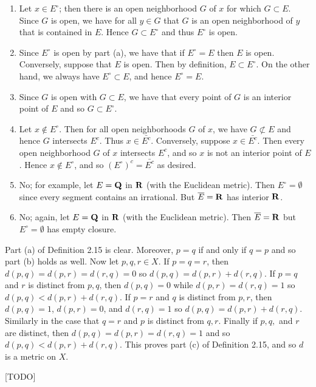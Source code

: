 \begin{ex}
\begin{enumerate}
\item Let $x \in E^{\circ}$; then there is an open neighborhood $G$ of $x$ for which $G \subset E$. Since $G$ is open, we have for all $y \in G$ that $G$ is an open neighborhood of $y$ that is contained in $E$. Hence $G \subset E^{\circ}$ and thus $E^{\circ}$ is open.

\item Since $E^{\circ}$ is open by part (a), we have that if $E^{\circ} = E$ then $E$ is open. Conversely, suppose that $E$ is open. Then by definition, $E \subset E^{\circ}$. On the other hand, we always have $E^{\circ} \subset E$, and hence $E^{\circ} = E$.

\item Since $G$ is open with $G \subset E$, we have that every point of $G$ is an interior point of $E$ and so $G \subset E^{\circ}$.

\item Let $x \not \in E^{\circ}$. Then for all open neighborhoods $G$ of $x$, we have $G \not \subset E$ and hence $G$ intersects $E^c$. Thus $x \in \bar{E^c}$. Conversely, suppose $x \in \bar{E^c}$. Then every open neighborhood $G$ of $x$ intersects $E^c$, and so $x$ is not an interior point of $E$. Hence $x \not \in E^{\circ}$, and so $(E^{\circ})^c = \bar{E^c}$ as desired.

\item No; for example, let $E = \mathbf{Q}$ in $\mathbf{R}$ (with the Euclidean metric). Then $E^{\circ} = \emptyset$ since every segment contains an irrational. But $\overline{E} = \mathbf{R}$ has interior $\mathbf{R}$.

\item No; again, let $E = \mathbf{Q}$ in $\mathbf{R}$ (with the Euclidean metric). Then $\overline{E} = \mathbf{R}$ but $E^{\circ} = \emptyset$ has empty closure.
\end{enumerate}
\end{ex}

\begin{ex}
Part (a) of Definition 2.15 is clear. Moreover, $p = q$ if and only if $q = p$ and so part (b) holds as well. Now let $p, q, r \in X$. If $p = q = r$, then $d(p, q) = d(p, r) = d(r, q) = 0$ so $d(p, q) = d(p, r) + d(r, q)$. If $p = q$ and $r$ is distinct from $p, q$, then $d(p, q) = 0$ while $d(p, r) = d(r, q) = 1$ so $d(p, q) < d(p, r) + d(r, q)$. If $p = r$ and $q$ is distinct from $p, r$, then $d(p, q) = 1$, $d(p, r) = 0$, and $d(r, q) = 1$ so $d(p, q) = d(p, r) + d(r, q)$. Similarly in the case that $q = r$ and $p$ is distinct from $q, r$. Finally if $p, q,$ and $r$ are distinct, then $d(p, q) = d(p, r) = d(r, q) = 1$ and so $d(p, q) < d(p, r) + d(r, q)$. This proves part (c) of Definition 2.15, and so $d$ is a metric on $X$.

[TODO]
\end{ex}

